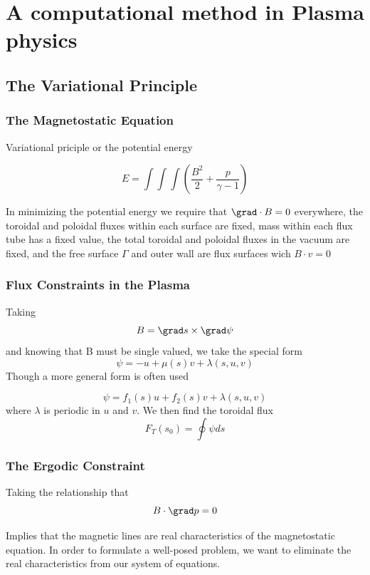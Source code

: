 \chapter{A computational method in Plasma physics}

\section{The Variational Principle}

\subsection{The Magnetostatic Equation}

Variational priciple or the potential energy

\[
E = \int \int \int \left(\frac{B^2}{2} + \frac{p}{\gamma -1 }   \right)
  \]

  In minimizing the potential energy we require that $\grad \cdot B = 0$ everywhere, the toroidal and poloidal fluxes within each surface are fixed, mass within each flux tube has a fixed value, the total toroidal and poloidal fluxes in the vacuum are fixed, and the free surface $\Gamma$ and outer wall are flux surfaces wich $B \cdot v = 0$


\subsection{Flux Constraints in the Plasma}

Taking
\[
B = \grad s \times \grad \psi
  \]
  and knowing that B must be single valued, we take the special form
\[
\psi = -u+ \mu(s) v + \lambda(s,u,v)
  \]
  Though a more general form is often used

  \[
\psi = f_1(s)u+ f_2(s) v + \lambda(s,u,v)
  \]
  where $\lambda$ is periodic in $u$ and $v$. We then find the toroidal flux
\[
F_T(s_0) = \oint \psi ds
  \]
\subsection{The Ergodic Constraint}

Taking the relationship that
\[
B \cdot \grad p = 0
  \]

  Implies that the magnetic lines are real characteristics of the magnetostatic equation. In order to formulate a well-posed problem, we want to eliminate the real characteristics from our system of equations.
